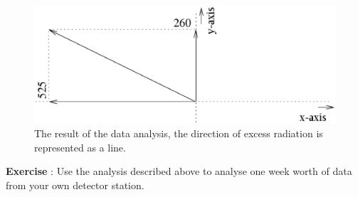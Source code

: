 \documentclass[12pt,a4paper]{article}
\numberwithin{equation}{section}
\numberwithin{figure}{section}
\newcounter{Exercise}
\numberwithin{table}{section}
\begin{document}
\begin{figure}\begin{center}
\includegraphics[scale=0.5]{direction.eps}
\caption{The result of the data analysis, the direction of excess radiation is represented as a line.}\label{fig:direction}
\end{center}\end{figure} 

\begin{shaded}
\textbf{Exercise \theExercise {}} : Use the analysis described above to analyse one week worth of data from your own detector station.\end{shaded}
\end{document}

